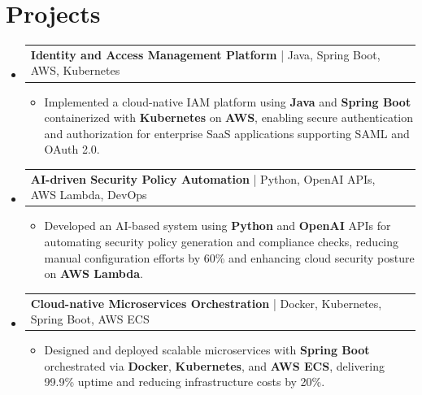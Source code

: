 \documentclass[letterpaper,10pt]{article}
\makeatletter
\newcommand{\resumeItem}[1]{
  \item{\fontsize{8pt}{9pt}\selectfont
    #1 \vspace{-3pt}
  }
}
\newcommand{\resumeProjectHeading}[2]{
    \item
    \begin{tabular*}{1.001\textwidth}{l@{\extracolsep{\fill}}r}
      \fontsize{8.5pt}{10pt}#1 & \textbf{\fontsize{8.5pt}{10pt} #2}\\
    \end{tabular*}\vspace{-7pt}
}
\newcommand{\resumeSubHeadingListStart}{\begin{itemize}[leftmargin=0pt, label={}]}
\newcommand{\resumeSubHeadingListEnd}{\end{itemize}}
\newcommand{\resumeItemListStart}{\begin{itemize}[leftmargin=*]}
\newcommand{\resumeItemListEnd}{\end{itemize}\vspace{-5pt}}
\makeatother
\begin{document}
\section{Projects}
    \vspace{-5pt}
    \resumeSubHeadingListStart
          \resumeProjectHeading
            {\textbf{Identity and Access Management Platform} | Java, Spring Boot, AWS, Kubernetes}
            {}
            \resumeItemListStart
                \resumeItem{Implemented a cloud-native IAM platform using \textbf{Java} and \textbf{Spring Boot} containerized with \textbf{Kubernetes} on \textbf{AWS}, enabling secure authentication and authorization for enterprise SaaS applications supporting SAML and OAuth 2.0.}
            \resumeItemListEnd
        \vspace{-12pt}
        \resumeProjectHeading
            {\textbf{AI-driven Security Policy Automation} | Python, OpenAI APIs, AWS Lambda, DevOps}
            {}
            \resumeItemListStart
                \resumeItem{Developed an AI-based system using \textbf{Python} and \textbf{OpenAI} APIs for automating security policy generation and compliance checks, reducing manual configuration efforts by 60\% and enhancing cloud security posture on \textbf{AWS Lambda}.}
            \resumeItemListEnd
        \vspace{-12pt}
        \resumeProjectHeading
            {\textbf{Cloud-native Microservices Orchestration} | Docker, Kubernetes, Spring Boot, AWS ECS}
            {}
            \resumeItemListStart
                \resumeItem{Designed and deployed scalable microservices with \textbf{Spring Boot} orchestrated via \textbf{Docker}, \textbf{Kubernetes}, and \textbf{AWS ECS}, delivering 99.9\% uptime and reducing infrastructure costs by 20\%.}
            \resumeItemListEnd
    \resumeSubHeadingListEnd
\end{document}
